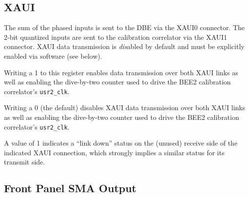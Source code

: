 \documentclass[12pt]{article}
\begin{document}
  \subsection{XAUI}

The sum of the phased inputs is sent to the DBE via the XAUI0 connector.  The
2-bit quantized inputs are sent to the calibration correlator via the XAUI1
connector.  XAUI data transmission is \emph{dis}abled by default and must be
explicitly enabled via software (see below).

\begin{description}

 Writing a 1 to this register enables data transmission over
both XAUI links as well as enabling the dive-by-two counter used to drive the
BEE2 calibration correlator's \verb|usr2_clk|.

Writing a 0 (the default) disables XAUI data transmission over both XAUI links
as well as enabling the dive-by-two counter used to drive the BEE2 calibration
correlator's \verb|usr2_clk|.

\filbreak
{}
 A value of 1 indicates a ``link down'' status on
the (unused) receive side of the indicated XAUI connection, which strongly
implies a similar status for its transmit side.

\end{description}

  \subsection{Front Panel SMA Output}
\end{document}
